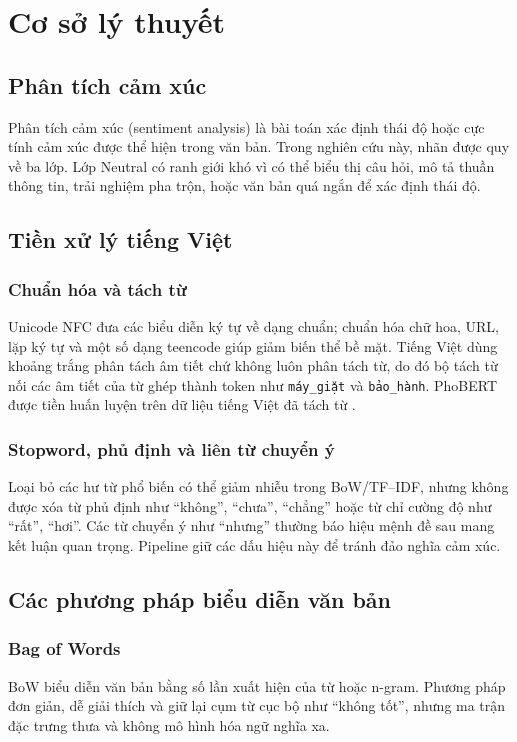 \chapter{Cơ sở lý thuyết}

\section{Phân tích cảm xúc}
Phân tích cảm xúc (sentiment analysis) là bài toán xác định thái độ hoặc cực tính cảm xúc được thể hiện trong văn bản. Trong nghiên cứu này, nhãn được quy về ba lớp. Lớp Neutral có ranh giới khó vì có thể biểu thị câu hỏi, mô tả thuần thông tin, trải nghiệm pha trộn, hoặc văn bản quá ngắn để xác định thái độ.

\section{Tiền xử lý tiếng Việt}
\subsection{Chuẩn hóa và tách từ}
Unicode NFC đưa các biểu diễn ký tự về dạng chuẩn; chuẩn hóa chữ hoa, URL, lặp ký tự và một số dạng teencode giúp giảm biến thể bề mặt. Tiếng Việt dùng khoảng trắng phân tách âm tiết chứ không luôn phân tách từ, do đó bộ tách từ nối các âm tiết của từ ghép thành token như \texttt{máy_giặt} và \texttt{bảo_hành}. PhoBERT được tiền huấn luyện trên dữ liệu tiếng Việt đã tách từ \cite{nguyen2020phobert}.

\subsection{Stopword, phủ định và liên từ chuyển ý}
Loại bỏ các hư từ phổ biến có thể giảm nhiễu trong BoW/TF--IDF, nhưng không được xóa từ phủ định như ``không'', ``chưa'', ``chẳng'' hoặc từ chỉ cường độ như ``rất'', ``hơi''. Các từ chuyển ý như ``nhưng'' thường báo hiệu mệnh đề sau mang kết luận quan trọng. Pipeline giữ các dấu hiệu này để tránh đảo nghĩa cảm xúc.

\section{Các phương pháp biểu diễn văn bản}
\subsection{Bag of Words}
BoW biểu diễn văn bản bằng số lần xuất hiện của từ hoặc n-gram. Phương pháp đơn giản, dễ giải thích và giữ lại cụm từ cục bộ như ``không tốt'', nhưng ma trận đặc trưng thưa và không mô hình hóa ngữ nghĩa xa.

